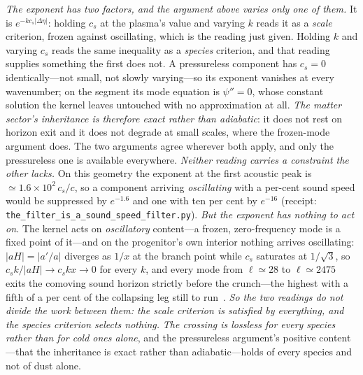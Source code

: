 \documentclass[11pt,a4paper]{article}
\theoremstyle{plain}
\theoremstyle{definition}
\theoremstyle{remark}
\begin{document}
\emph{The exponent has two factors, and the argument above varies only one of them.} It is
$e^{-k c_s\lvert\Delta\eta\rvert}$: holding $c_s$ at the plasma's value and varying $k$ reads it as a
\emph{scale} criterion, frozen against oscillating, which is the reading just given. Holding $k$ and varying
$c_s$ reads the same inequality as a \emph{species} criterion, and that reading supplies something the first
does not. A pressureless component has $c_s=0$ identically---not small, not slowly varying---so its exponent
vanishes at every wavenumber; on the segment its mode equation is $\psi''=0$, whose constant solution the
kernel leaves untouched with no approximation at all. \emph{The matter sector's inheritance is therefore exact
rather than adiabatic}: it does not rest on horizon exit and it does not degrade at small scales, where the
frozen-mode argument does. The two arguments agree wherever both apply, and only the pressureless one is
available everywhere. \emph{Neither reading carries a constraint the other lacks.} On this geometry the exponent at the first acoustic peak
is $\simeq1.6\times10^{2}\,c_s/c$, so a component arriving \emph{oscillating} with a per-cent sound speed
would be suppressed by $e^{-1.6}$ and one with ten per cent by $e^{-16}$ (receipt:
\texttt{the\_filter\_is\_a\_sound\_speed\_filter.py}).
\emph{But the exponent has nothing to act on.} The kernel acts on
\emph{oscillatory} content---a frozen, zero-frequency mode is a fixed point of it---and on the progenitor's own
interior nothing arrives oscillating: $\lvert aH\rvert=\lvert a'/a\rvert$ diverges as $1/x$ at the branch point
while $c_s$ saturates at $1/\sqrt3$, so $c_sk/\lvert aH\rvert\to c_skx\to0$ for every $k$, and every mode from
$\ell\simeq28$ to $\ell\simeq2475$ exits the comoving sound horizon strictly before the crunch---the highest
with a fifth of a per cent of the collapsing leg still to run~\cite{JanzenCosmogenesis}. \emph{So the two
readings do not divide the work between them: the scale criterion is satisfied by everything, and the species
criterion selects nothing.} \emph{The crossing is lossless for every species rather than for cold ones alone},
and the pressureless argument's positive content---that the inheritance is exact rather than
adiabatic---holds of every species and not of dust alone.
\end{document}
